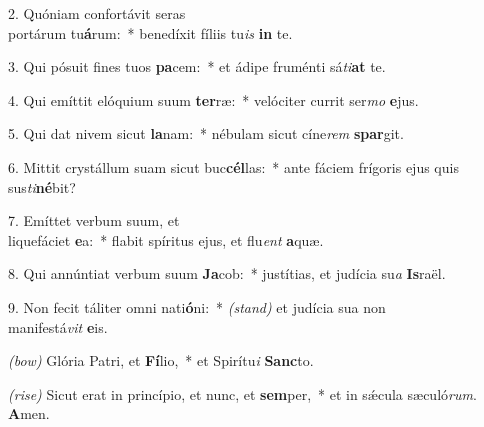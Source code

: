 2. Quóniam confortávit seras\\ portárum tu\textbf{á}rum:~* benedíxit fíliis tu\textit{is} \textbf{in} te.

3. Qui pósuit fines tuos \textbf{pa}cem:~* et ádipe fruménti sá\textit{ti}\textbf{at} te.

4. Qui emíttit elóquium suum \textbf{ter}ræ:~* velóciter currit ser\textit{mo} \textbf{e}jus.

5. Qui dat nivem sicut \textbf{la}nam:~* nébulam sicut cíne\textit{rem} \textbf{spar}git.

6. Mittit crystállum suam sicut buc\textbf{cél}las:~* ante fáciem frígoris ejus quis sus\textit{ti}\textbf{né}bit?

7. Emíttet verbum suum, et\\ liquefáciet \textbf{e}a:~* flabit spíritus ejus, et flu\textit{ent} \textbf{a}quæ.

8. Qui annúntiat verbum suum \textbf{Ja}cob:~* justítias, et judícia su\textit{a} \textbf{Is}raël.

9. Non fecit táliter omni nati\textbf{ó}ni:~* {\color{red}\textit{(stand)}} et judícia sua non\\ manifestá\textit{vit} \textbf{e}is.

{\color{red}\textit{(bow)}} Glória Patri, et \textbf{Fí}lio,~* et Spirítu\textit{i} \textbf{Sanc}to.

{\color{red}\textit{(rise)}} Sicut erat in princípio, et nunc, et \textbf{sem}per,~* et in s\'{\ae}cula sæculó\textit{rum}. \textbf{A}men.